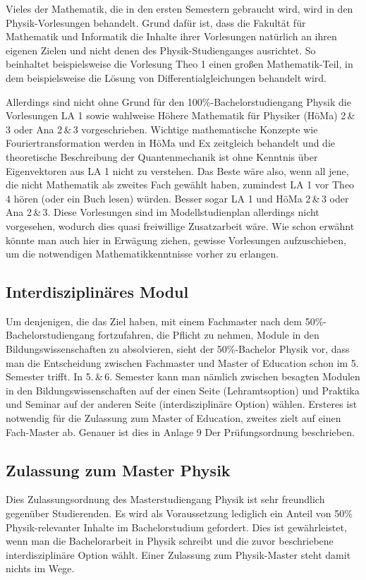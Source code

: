 Vieles der Mathematik, die in den ersten Semestern gebraucht wird, wird in
den Physik-Vorlesungen behandelt. Grund dafür ist, dass die Fakultät für
Mathematik und Informatik die Inhalte ihrer Vorlesungen natürlich an ihren
eigenen Zielen und nicht denen des Physik-Studienganges ausrichtet. So
beinhaltet beispielsweise die Vorlesung Theo 1 einen großen Mathematik-Teil,
in dem beispielsweise die Lösung von Differentialgleichungen behandelt wird.

Allerdings sind nicht ohne Grund für den 100\%-Bachelorstudiengang Physik
die Vorlesungen LA 1 sowie wahlweise Höhere Mathematik für Physiker (HöMa)
2\,\&\,3 oder Ana 2\,\&\,3 vorgeschrieben. Wichtige mathematische Konzepte
wie Fouriertransformation werden in HöMa und Ex zeitgleich behandelt und die
theoretische Beschreibung der Quantenmechanik ist ohne Kenntnis über
Eigenvektoren aus LA 1 nicht zu verstehen. Das Beste wäre also, wenn all
jene, die nicht Mathematik als zweites Fach gewählt haben, zumindest LA 1
vor Theo 4 hören (oder ein Buch lesen) würden. Besser sogar LA 1 und HöMa
2\,\&\,3 oder Ana 2\,\&\,3. Diese Vorlesungen sind im Modellstudienplan
allerdings nicht vorgesehen, wodurch dies quasi freiwillige Zusatzarbeit
wäre. Wie schon erwähnt könnte man auch hier in Erwägung ziehen, gewisse
Vorlesungen aufzuschieben, um die notwendigen Mathematikkenntnisse vorher zu
erlangen.


\subsection{Interdisziplinäres Modul}

Um denjenigen, die das Ziel haben, mit einem Fachmaster nach dem
50\%-Bachelorstudiengang fortzufahren, die Pflicht zu nehmen, Module in den
Bildungswissenschaften zu absolvieren, sieht der 50\%-Bachelor Physik vor,
dass man die Entscheidung zwischen Fachmaster und Master of Education schon
im 5. Semester trifft. In 5.\,\&\,6. Semester kann man nämlich zwischen
besagten Modulen in den Bildungswissenschaften auf der einen Seite
(Lehramtsoption) und Praktika und Seminar auf der anderen Seite
(interdisziplinäre Option) wählen. Ersteres ist notwendig für die Zulassung
zum Master of Education, zweites zielt auf einen Fach-Master ab. Genauer ist
dies in Anlage 9 Der Prüfungsordnung beschrieben.


\subsection{Zulassung zum Master Physik}

Dies Zulassungsordnung des Masterstudiengang Physik ist sehr freundlich
gegenüber Studierenden. Es wird als Voraussetzung lediglich ein Anteil von
50\% Physik-relevanter Inhalte im Bachelorstudium gefordert. Dies ist
gewährleistet, wenn man die Bachelorarbeit in Physik schreibt und die zuvor
beschriebene interdisziplinäre Option wählt. Einer Zulassung zum
Physik-Master steht damit nichts im Wege.



